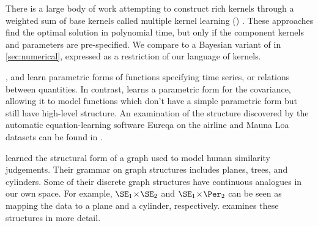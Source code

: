 There is a large body of work attempting to construct rich kernels through a weighted sum of base kernels called multiple kernel learning (\MKL{}) \citep[e.g.][]{bach2004multiple}.
These approaches find the optimal solution in polynomial time, but only if the component kernels and parameters are pre-specified.
We compare to a Bayesian variant of \MKL{} in \cref{sec:numerical}, expressed as a restriction of our language of kernels.


\cite{todorovski1997declarative}, \cite{washio1999discovering} and \cite{Schmidt2009b} learn parametric forms of functions specifying time series, or relations between quantities.
In contrast, \procedurename{} learns a parametric form for the covariance, allowing it to model functions which don't have a simple parametric form but still have high-level structure.
An examination of the structure discovered by the automatic equation-learning software Eureqa \citep{Eureqa} on the airline and Mauna Loa datasets can be found in \citep{LloDuvGroetal14}.





\citet{kemp2008discovery} learned the structural form of a graph used to model human similarity judgements.
Their grammar on graph structures includes planes, trees, and cylinders.
Some of their discrete graph structures have continuous analogues in our own space.
For example, $\SE_1 \kerntimes \SE_2$ and $\SE_1 \kerntimes \Per_2$ can be seen as mapping the data to a plane and a cylinder, respectively.
 examines these structures in more detail.

